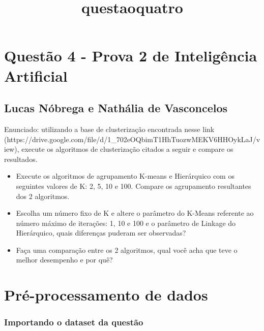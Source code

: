 \documentclass[11pt]{article}
\title{questaoquatro}
\providecommand{\tightlist}{%
      \setlength{\itemsep}{0pt}\setlength{\parskip}{0pt}}
\begin{document}
    
    
    \maketitle
    
    

    
    \section{Questão 4 - Prova 2 de Inteligência
Artificial}\label{questuxe3o-4---prova-2-de-inteliguxeancia-artificial}

\subsection{Lucas Nóbrega e Nathália de
Vasconcelos}\label{lucas-nuxf3brega-e-nathuxe1lia-de-vasconcelos}

Enunciado: utilizando a base de clusterização encontrada nesse link
(https://drive.google.com/file/d/1\_702eOQbimT1HhTuozwMEKV6HHOykLaJ/view),
execute os algoritmos de clusterização citados a seguir e compare os
resultados.

\begin{itemize}
\tightlist
\item
  Execute os algoritmos de agrupamento K-means e Hierárquico com os
  seguintes valores de K: 2, 5, 10 e 100. Compare os agrupamento
  resultantes dos 2 algoritmos.
\item
  Escolha um número fixo de K e altere o parâmetro do K-Means referente
  ao número máximo de iterações: 1, 10 e 100 e o parâmetro de Linkage do
  Hierárquico, quais diferenças puderam ser observadas?
\item
  Faça uma comparação entre os 2 algoritmos, qual você acha que teve o
  melhor desempenho e por quê?
\end{itemize}

    \section{Pré-processamento de
dados}\label{pruxe9-processamento-de-dados}

    \subsubsection{Importando o dataset da
questão}\label{importando-o-dataset-da-questuxe3o}
\end{document}
